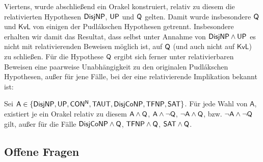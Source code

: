 Viertens, wurde abschließend ein Orakel konstruiert, relativ zu diesem die relativierten Hypothesen $\mathsf{DisjNP}$, $\mathsf{UP}$ und $\mathsf{Q}$ gelten.
Damit wurde insbesondere $\mathsf{Q}$ und $\mathsf{KvL}$ von einigen der Pudlákschen Hypothesen getrennt. Insbesondere erhalten wir damit das Resultat, dass selbst unter Annahme von $\mathsf{DisjNP}\land\mathsf{UP}$ es nicht mit relativierenden Beweisen möglich ist, auf $\mathsf{Q}$ (und auch nicht auf $\mathsf{KvL}$) zu schließen.
Für die Hypothese $\mathsf{Q}$ ergibt sich ferner unter relativierbaren Beweisen eine paarweise Unabhängigkeit zu den originalen Pudlákschen Hypothesen, außer für jene Fälle, bei der eine relativierende Implikation bekannt ist:

\begin{corollary}
    Sei $\mathsf A \in \{\mathsf{DisjNP}, \mathsf{UP}, \mathsf{CON^{N}}, \mathsf{TAUT}, \mathsf{DisjCoNP}, \mathsf{TFNP}, \mathsf{SAT}\}$.
    Für jede Wahl von $\mathsf A$, existiert je ein Orakel relativ zu diesem $\mathsf A\land \mathsf{Q}$, $\mathsf A\land \neg\mathsf{Q}$, $\neg\mathsf A\land \mathsf{Q}$, bzw. $\neg\mathsf A\land\neg\mathsf{Q}$ gilt, außer für die Fälle $\mathsf{DisjCoNP}\land\mathsf{Q}$, $\mathsf{TFNP}\land\mathsf{Q}$, $\mathsf{SAT}\land\mathsf{Q}$.
\end{corollary}

\subsection*{Offene Fragen}

